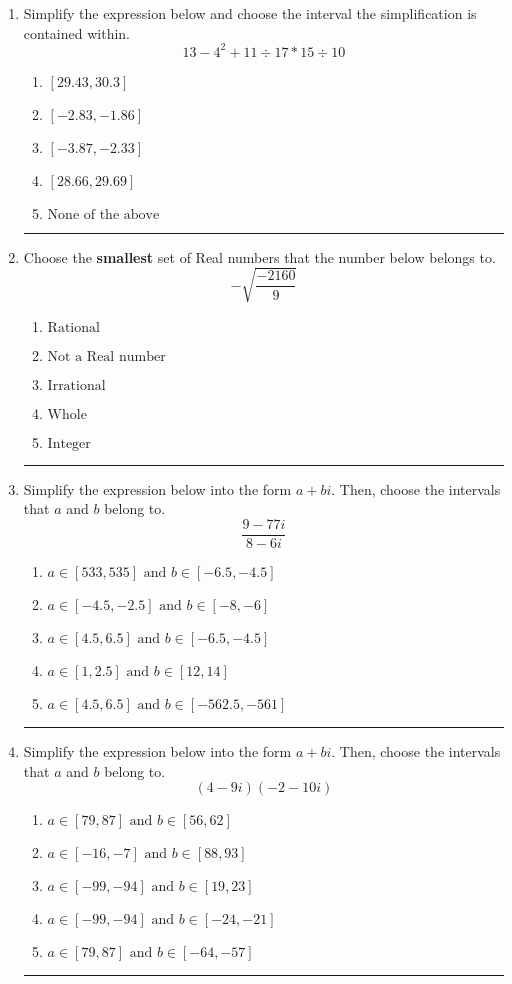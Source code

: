 \documentclass[14pt]{extbook}
\newcommand{\litem}[1]{\item#1\hspace*{-1cm}\rule{\textwidth}{0.4pt}}
\begin{document}
\begin{enumerate}
\litem{
Simplify the expression below and choose the interval the simplification is contained within.\[ 13 - 4^2 + 11 \div 17 * 15 \div 10 \]\begin{enumerate}[label=\Alph*.]
\item \( [29.43, 30.3] \)
\item \( [-2.83, -1.86] \)
\item \( [-3.87, -2.33] \)
\item \( [28.66, 29.69] \)
\item \( \text{None of the above} \)

\end{enumerate} }
\litem{
Choose the \textbf{smallest} set of Real numbers that the number below belongs to.\[ -\sqrt{\frac{-2160}{9}} \]\begin{enumerate}[label=\Alph*.]
\item \( \text{Rational} \)
\item \( \text{Not a Real number} \)
\item \( \text{Irrational} \)
\item \( \text{Whole} \)
\item \( \text{Integer} \)

\end{enumerate} }
\litem{
Simplify the expression below into the form $a+bi$. Then, choose the intervals that $a$ and $b$ belong to.\[ \frac{9 - 77 i}{8 - 6 i} \]\begin{enumerate}[label=\Alph*.]
\item \( a \in [533, 535] \text{ and } b \in [-6.5, -4.5] \)
\item \( a \in [-4.5, -2.5] \text{ and } b \in [-8, -6] \)
\item \( a \in [4.5, 6.5] \text{ and } b \in [-6.5, -4.5] \)
\item \( a \in [1, 2.5] \text{ and } b \in [12, 14] \)
\item \( a \in [4.5, 6.5] \text{ and } b \in [-562.5, -561] \)

\end{enumerate} }
\litem{
Simplify the expression below into the form $a+bi$. Then, choose the intervals that $a$ and $b$ belong to.\[ (4 - 9 i)(-2 - 10 i) \]\begin{enumerate}[label=\Alph*.]
\item \( a \in [79, 87] \text{ and } b \in [56, 62] \)
\item \( a \in [-16, -7] \text{ and } b \in [88, 93] \)
\item \( a \in [-99, -94] \text{ and } b \in [19, 23] \)
\item \( a \in [-99, -94] \text{ and } b \in [-24, -21] \)
\item \( a \in [79, 87] \text{ and } b \in [-64, -57] \)


\end{enumerate}}
\end{enumerate}
\end{document}
